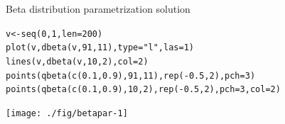 \documentclass[xcolor=table,       handout,    xcolor=dvipsnames]{beamer}\usepackage[]{graphicx}\usepackage[]{color}
\makeatletter
\newcommand{\hlnum}[1]{\textcolor[rgb]{0,0,0}{#1}}
\newcommand{\hlstr}[1]{\textcolor[rgb]{0.545,0.137,0.137}{#1}}
\newcommand{\hlopt}[1]{\textcolor[rgb]{0,0,0}{#1}}
\newcommand{\hlstd}[1]{\textcolor[rgb]{0,0,0}{#1}}
\newcommand{\hlkwb}[1]{\textcolor[rgb]{0,0,0}{#1}}
\newcommand{\hlkwc}[1]{\textcolor[rgb]{1,0,1}{#1}}
\newcommand{\hlkwd}[1]{\textcolor[rgb]{0,0,1}{#1}}
\newenvironment{kframe}{%
 \def\at@end@of@kframe{}%
 \ifinner\ifhmode%
  \def\at@end@of@kframe{\end{minipage}}%
  \begin{minipage}{\columnwidth}%
 \fi\fi%
 \def\FrameCommand##1{\hskip\@totalleftmargin \hskip-\fboxsep
 \colorbox{shadecolor}{##1}\hskip-\fboxsep
     \hskip-\linewidth \hskip-\@totalleftmargin \hskip\columnwidth}%
 \MakeFramed {\advance\hsize-\width
   \@totalleftmargin\z@ \linewidth\hsize
   \@setminipage}}%
 {\par\unskip\endMakeFramed%
 \at@end@of@kframe}
\newenvironment{knitrout}{}{} %
\makeatother
\begin{document}

\begin{frame}[fragile]{Beta distribution parametrization solution}
\vspace{-1em}
\begin{knitrout}
\color{fgcolor}\begin{kframe}
\begin{alltt}
\hlstd{v} \hlkwb{<-} \hlkwd{seq}\hlstd{(}\hlnum{0}\hlstd{,}\hlnum{1}\hlstd{,} \hlkwc{len}\hlstd{=}\hlnum{200}\hlstd{)}
\hlkwd{plot}\hlstd{(v,} \hlkwd{dbeta}\hlstd{(v,} \hlnum{91}\hlstd{,}\hlnum{11}\hlstd{),} \hlkwc{type}\hlstd{=}\hlstr{"l"}\hlstd{,} \hlkwc{las}\hlstd{=}\hlnum{1}\hlstd{)}
\hlkwd{lines}\hlstd{(v,} \hlkwd{dbeta}\hlstd{(v,} \hlnum{10}\hlstd{,}\hlnum{2}\hlstd{),} \hlkwc{col}\hlstd{=}\hlnum{2}\hlstd{)}
\hlkwd{points}\hlstd{(}\hlkwd{qbeta}\hlstd{(}\hlkwd{c}\hlstd{(}\hlnum{0.1}\hlstd{,} \hlnum{0.9}\hlstd{),} \hlnum{91}\hlstd{,}\hlnum{11}\hlstd{),} \hlkwd{rep}\hlstd{(}\hlopt{-}\hlnum{0.5}\hlstd{,}\hlnum{2}\hlstd{),} \hlkwc{pch}\hlstd{=}\hlnum{3}\hlstd{)}
\hlkwd{points}\hlstd{(}\hlkwd{qbeta}\hlstd{(}\hlkwd{c}\hlstd{(}\hlnum{0.1}\hlstd{,} \hlnum{0.9}\hlstd{),} \hlnum{10}\hlstd{,}\hlnum{2}\hlstd{),} \hlkwd{rep}\hlstd{(}\hlopt{-}\hlnum{0.5}\hlstd{,}\hlnum{2}\hlstd{),} \hlkwc{pch}\hlstd{=}\hlnum{3}\hlstd{,} \hlkwc{col}\hlstd{=}\hlnum{2}\hlstd{)}
\end{alltt}
\end{kframe}

{\centering \texttt{[image: ./fig/betapar-1]} 

}



\end{knitrout}
\end{frame}

\end{document}
